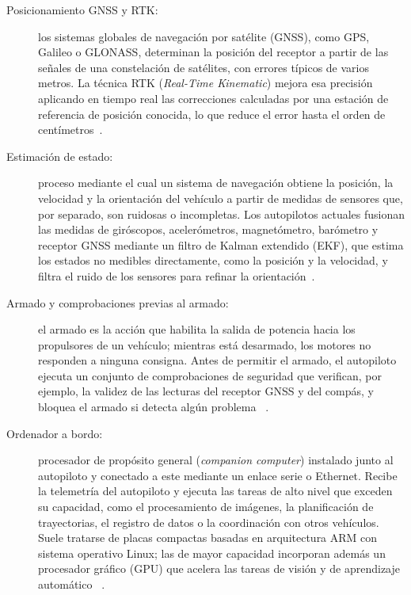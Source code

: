 \begin{description}
  \item[Posicionamiento GNSS y RTK:] los sistemas globales de navegación por satélite
    (GNSS), como GPS, Galileo o GLONASS, determinan la posición del receptor a partir de
    las señales de una constelación de satélites, con errores típicos de varios metros.
    La técnica RTK (\textit{Real-Time Kinematic}) mejora esa precisión aplicando en
    tiempo real las correcciones calculadas por una estación de referencia de posición
    conocida, lo que reduce el error hasta el orden de centímetros~\cite{Cite13}.
 
  \item[Estimación de estado:] proceso mediante el cual un sistema de navegación
    obtiene la posición, la velocidad y la orientación del vehículo a partir de medidas
    de sensores que, por separado, son ruidosas o incompletas. Los autopilotos
    actuales fusionan las medidas de giróscopos, acelerómetros, magnetómetro, barómetro
    y receptor GNSS mediante un filtro de Kalman extendido (EKF), que estima los estados
    no medibles directamente, como la posición y la velocidad, y filtra el ruido de los
    sensores para refinar la orientación~\cite{aliane2026}.
 
  \item[Armado y comprobaciones previas al armado:] el armado es la acción que habilita
    la salida de potencia hacia los propulsores de un vehículo; mientras está
    desarmado, los motores no responden a ninguna consigna. Antes de permitir el armado,
    el autopiloto ejecuta un conjunto de comprobaciones de seguridad que verifican, por
    ejemplo, la validez de las lecturas del receptor GNSS y del compás, y bloquea el
    armado si detecta algún problema~\cite{iniesta2025} \cite{kumar2025}.
 
  \item[Ordenador a bordo:] procesador de propósito general (\textit{companion
    computer}) instalado junto al autopiloto y conectado a este mediante un enlace
    serie o Ethernet. Recibe la telemetría del autopiloto y ejecuta las tareas de alto
    nivel que exceden su capacidad, como el procesamiento de imágenes, la planificación
    de trayectorias, el registro de datos o la coordinación con otros vehículos. Suele
    tratarse de placas compactas basadas en arquitectura ARM con sistema operativo
    Linux; las de mayor capacidad incorporan además un procesador gráfico (GPU) que
    acelera las tareas de visión y de aprendizaje automático~\cite{kumar2025} \cite{aliane2026}.


\end{description}
